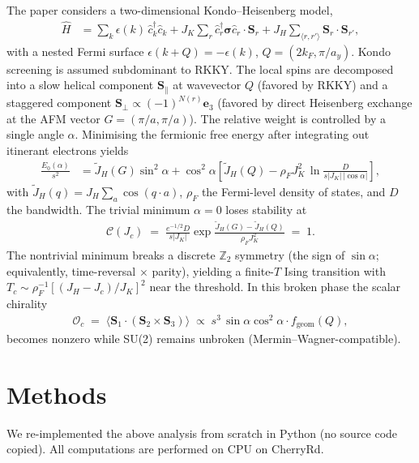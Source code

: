 \documentclass[11pt]{article}
\begin{document}
The paper considers a two-dimensional Kondo--Heisenberg model,
\begin{align}
  \hat{H} &= \sum_k \epsilon(k)\,\hat{c}^\dagger_k \hat{c}_k
          + J_K \sum_r \hat{c}^\dagger_r \boldsymbol{\sigma}\hat{c}_r\cdot \mathbf{S}_r
          + J_H \sum_{\langle r,r'\rangle} \mathbf{S}_r\cdot\mathbf{S}_{r'},
\end{align}
with a nested Fermi surface $\epsilon(k+Q)=-\epsilon(k)$, $Q=(2k_F,\pi/a_y)$.
Kondo screening is assumed subdominant to RKKY. The local spins are decomposed
into a slow helical component $\mathbf{S}_\parallel$ at wavevector $Q$ (favored by
RKKY) and a staggered component $\mathbf{S}_\perp \propto (-1)^{N(r)}\mathbf{e}_3$
(favored by direct Heisenberg exchange at the AFM vector $G=(\pi/a,\pi/a)$). The
relative weight is controlled by a single angle $\alpha$. Minimising the
fermionic free energy after integrating out itinerant electrons yields
\begin{align}
  \frac{E_0(\alpha)}{s^2}
  &= \tilde{J}_H(G)\sin^2\alpha
  + \cos^2\alpha\!\left[\tilde{J}_H(Q) - \rho_F J_K^2\,
      \ln\!\frac{D}{s|J_K|\,|\cos\alpha|}\right],
  \label{eq:E0}
\end{align}
with $\tilde{J}_H(q)=J_H\sum_a \cos(q\cdot a)$, $\rho_F$ the Fermi-level density
of states, and $D$ the bandwidth. The trivial minimum $\alpha=0$ loses stability
at
\begin{align}
  \mathcal{C}(J_c) \;=\; \frac{e^{-1/2} D}{s|J_K|}
  \exp\!\frac{\tilde J_H(G)-\tilde J_H(Q)}{\rho_F J_K^2} \;=\; 1.
  \label{eq:Jc}
\end{align}
The nontrivial minimum breaks a discrete $\mathbb{Z}_2$ symmetry (the sign of
$\sin\alpha$; equivalently, time-reversal $\times$ parity), yielding a
finite-$T$ Ising transition with $T_c\sim \rho_F^{-1}[(J_H-J_c)/J_K]^2$ near the
threshold. In this broken phase the scalar chirality
\begin{align}
  \mathcal{O}_c \;=\; \langle \mathbf{S}_1\cdot(\mathbf{S}_2\times\mathbf{S}_3)\rangle
  \;\propto\; s^3\,\sin\alpha\cos^2\alpha\cdot f_{\text{geom}}(Q),
  \label{eq:Oc}
\end{align}
becomes nonzero while SU(2) remains unbroken (Mermin--Wagner-compatible).

\section{Methods}

We re-implemented the above analysis from scratch in Python (no source code
copied). All computations are performed on CPU on CherryRd.
\end{document}
